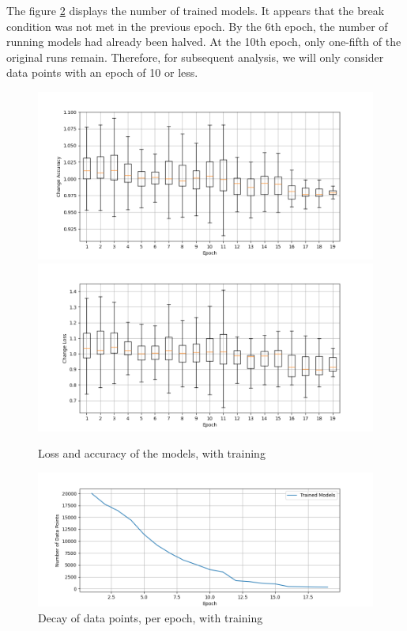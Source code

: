 The figure \ref{fig:decay_training} displays the number of trained models.
It appears that the break condition was not met in the previous epoch.
By the 6th epoch, the number of running models had already been halved.
At the 10th epoch, only one-fifth of the original runs remain.
Therefore, for subsequent analysis, we will only consider data points with an epoch of 10 or less.
\begin{figure}
    \centering
    \includegraphics[width=\textwidth]{plots/Trained_Change_Acc.png}
    \includegraphics[width=\textwidth]{plots/Trained_Change_Loss.png}
    \caption{Loss and accuracy of the models, with training}
    \label{fig:loss-accuracy-training}
\end{figure}
\begin{figure}
    \centering
    \includegraphics[width=\textwidth]{plots/Trained_Points_perEpoch.png}
    \caption{Decay of data points, per epoch, with training}
    \label{fig:decay_training}
\end{figure}
